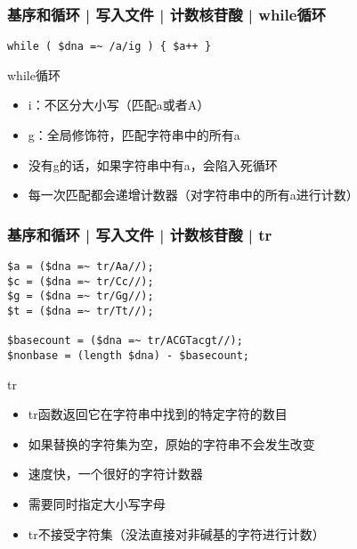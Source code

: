 \begin{frame}[fragile]
  \frametitle{基序和循环 | 写入文件 | 计数核苷酸 | \alert{while循环}}
\begin{lstlisting}
while ( $dna =~ /a/ig ) { $a++ }
\end{lstlisting}
\pause
\begin{block}{while循环}
  \begin{itemize}
    \item i：不区分大小写（匹配a或者A）
    \item g：全局修饰符，匹配字符串中的所有a
    \item 没有g的话，如果字符串中有a，会陷入死循环
    \item 每一次匹配都会递增计数器（对字符串中的所有a进行计数）
  \end{itemize}
\end{block}
\end{frame}

\begin{frame}[fragile]
  \frametitle{基序和循环 | 写入文件 | 计数核苷酸 | \alert{tr}}
\begin{lstlisting}
$a = ($dna =~ tr/Aa//);
$c = ($dna =~ tr/Cc//);
$g = ($dna =~ tr/Gg//);
$t = ($dna =~ tr/Tt//);

$basecount = ($dna =~ tr/ACGTacgt//);
$nonbase = (length $dna) - $basecount;
\end{lstlisting}
\pause
  \vspace{-0.5em}
\begin{block}{tr}
  \begin{itemize}
    \item tr函数返回它在字符串中找到的特定字符的数目
    \item 如果替换的字符集为空，原始的字符串不会发生改变
    \item 速度快，一个很好的字符计数器
    \item 需要同时指定大小写字母
    \item tr不接受字符集（没法直接对非碱基的字符进行计数）
  \end{itemize}
\end{block}
\end{frame}

